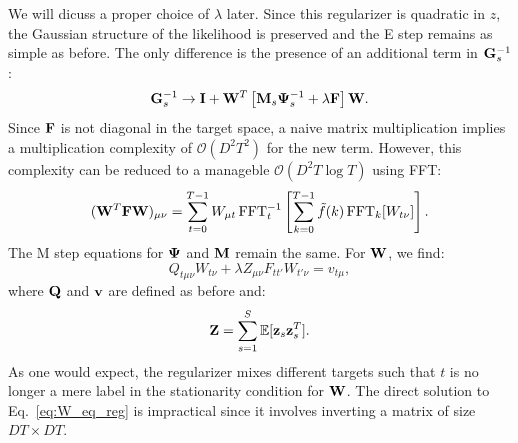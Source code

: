 \documentclass[nofootinbib,amssymb,amsmath]{revtex4}
\newcommand{\vI}{{\bf I}}
\newcommand{\vv}{{\bf v}}
\newcommand{\vz}{{\bf z}}
\newcommand{\vG}{{\bf G}}
\newcommand{\vQ}{{\bf Q}}
\newcommand{\vM}{{\bf M}}
\newcommand{\vW}{{\bf W}}
\newcommand{\vF}{{\bf F}}
\newcommand{\vZ}{{\bf Z}}
\newcommand{\vPsi}{{\bf \Psi}}
\newcommand{\EE}{\mathbb{E}}
\begin{document}
We will dicuss a proper choice of $\lambda$ later. Since this regularizer is quadratic in $z$, the Gaussian structure of the likelihood is preserved and the E step remains as simple as before. The only difference is the presence of an additional term in $\vG_s^{-1}$:
\begin{equation}
\vG_s^{-1} \rightarrow \vI + \vW^T \left[\vM_s \vPsi_s^{-1} + \lambda \vF\right]\vW.
\end{equation}
Since $\vF$ is not diagonal in the target space, a naive matrix multiplication implies a multiplication complexity of $\mathcal{O}(D^2 T^2)$ for the new term. However, this complexity can be reduced to a manageble $\mathcal{O}(D^2 T \log T)$ using FFT:
\begin{equation}
(\vW^T \vF \vW)_{\mu\nu} = \sum_{t=0}^{T-1} W_{\mu t} \, \mathrm{FFT}_t^{-1}\left[\sum_{k=0}^{T-1} \tilde{f}(k) \, \mathrm{FFT}_k[W_{t\nu}]\right].
\end{equation}
The M step equations for $\vPsi$ and $\vM$ remain the same. For $\vW$, we find:
\begin{equation}\label{eq:W_eq_reg}
Q_{t\mu\nu} W_{t\nu} + \lambda Z_{\mu\nu} F_{tt'} W_{t'\nu} = v_{t\mu},
\end{equation}
where $\vQ$ and $\vv$ are defined as before and:
\begin{equation}
\vZ = \sum_{s=1}^S \EE[\vz_s \vz_s^T].
\end{equation}
As one would expect, the regularizer mixes different targets such that $t$ is no longer a mere label in the stationarity condition for $\vW$. The direct solution to Eq.~\eqref{eq:W_eq_reg} is impractical since it involves inverting a matrix of size $DT \times DT$.
\end{document}
